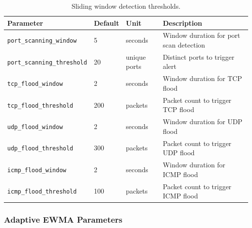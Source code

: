 \documentclass[12pt,a4paper]{article}
\begin{document}
\begin{table}[H]
\centering
\caption{Sliding window detection thresholds.}
\label{tab:window_params}
\begin{tabular}{llll}
\toprule
\textbf{Parameter} & \textbf{Default} & \textbf{Unit} & \textbf{Description} \\
\midrule
\texttt{port\_scanning\_window}    & 5   & seconds      & Window duration for port scan detection \\
\texttt{port\_scanning\_threshold} & 20  & unique ports & Distinct ports to trigger alert \\
\texttt{tcp\_flood\_window}        & 2   & seconds      & Window duration for TCP flood \\
\texttt{tcp\_flood\_threshold}     & 200 & packets      & Packet count to trigger TCP flood \\
\texttt{udp\_flood\_window}        & 2   & seconds      & Window duration for UDP flood \\
\texttt{udp\_flood\_threshold}     & 300 & packets      & Packet count to trigger UDP flood \\
\texttt{icmp\_flood\_window}       & 2   & seconds      & Window duration for ICMP flood \\
\texttt{icmp\_flood\_threshold}    & 100 & packets      & Packet count to trigger ICMP flood \\
\bottomrule
\end{tabular}
\end{table}

\subsubsection{Adaptive EWMA Parameters}
\end{document}
